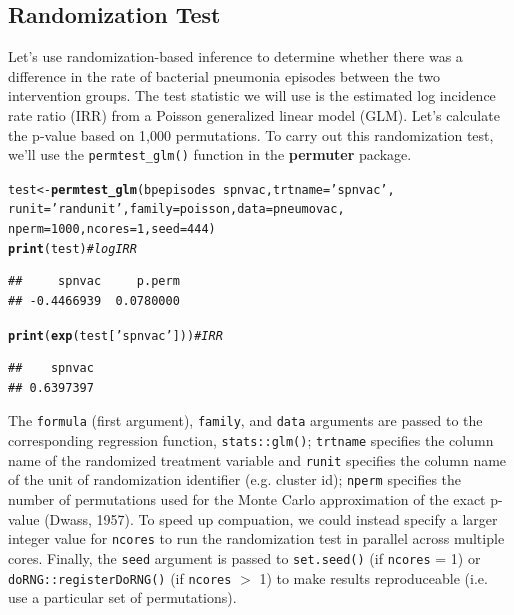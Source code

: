 \documentclass[12pt]{article}\usepackage[]{graphicx}\usepackage[]{color}
\makeatletter
\newcommand{\hlnum}[1]{\textcolor[rgb]{0.686,0.059,0.569}{#1}}%
\newcommand{\hlstr}[1]{\textcolor[rgb]{0.192,0.494,0.8}{#1}}%
\newcommand{\hlcom}[1]{\textcolor[rgb]{0.678,0.584,0.686}{\textit{#1}}}%
\newcommand{\hlopt}[1]{\textcolor[rgb]{0,0,0}{#1}}%
\newcommand{\hlstd}[1]{\textcolor[rgb]{0.345,0.345,0.345}{#1}}%
\newcommand{\hlkwb}[1]{\textcolor[rgb]{0.69,0.353,0.396}{#1}}%
\newcommand{\hlkwc}[1]{\textcolor[rgb]{0.333,0.667,0.333}{#1}}%
\newcommand{\hlkwd}[1]{\textcolor[rgb]{0.737,0.353,0.396}{\textbf{#1}}}%
\newenvironment{kframe}{%
 \def\at@end@of@kframe{}%
 \ifinner\ifhmode%
  \def\at@end@of@kframe{\end{minipage}}%
  \begin{minipage}{\columnwidth}%
 \fi\fi%
 \def\FrameCommand##1{\hskip\@totalleftmargin \hskip-\fboxsep
 \colorbox{shadecolor}{##1}\hskip-\fboxsep
     \hskip-\linewidth \hskip-\@totalleftmargin \hskip\columnwidth}%
 \MakeFramed {\advance\hsize-\width
   \@totalleftmargin\z@ \linewidth\hsize
   \@setminipage}}%
 {\par\unskip\endMakeFramed%
 \at@end@of@kframe}
\newenvironment{knitrout}{}{} %
\makeatother
\begin{document}
\subsection{Randomization Test}
Let's use randomization-based inference to determine whether there was a difference in the rate of bacterial pneumonia episodes between the two intervention groups. The test statistic we will use is the estimated log incidence rate ratio (IRR) from a Poisson generalized linear model (GLM). Let's calculate the p-value based on 1,000 permutations. To carry out this randomization test, we'll use the \texttt{permtest\_glm()} function in the \textbf{permuter} package.
\begin{knitrout}
\color{fgcolor}\begin{kframe}
\begin{alltt}
\hlstd{test} \hlkwb{<-} \hlkwd{permtest_glm}\hlstd{(bpepisodes} \hlopt{~} \hlstd{spnvac,} \hlkwc{trtname} \hlstd{=} \hlstr{'spnvac'}\hlstd{,}
                     \hlkwc{runit} \hlstd{=} \hlstr{'randunit'}\hlstd{,} \hlkwc{family} \hlstd{= poisson,} \hlkwc{data} \hlstd{= pneumovac,}
                     \hlkwc{nperm} \hlstd{=} \hlnum{1000}\hlstd{,} \hlkwc{ncores} \hlstd{=} \hlnum{1}\hlstd{,} \hlkwc{seed} \hlstd{=} \hlnum{444}\hlstd{)}
\hlkwd{print}\hlstd{(test)} \hlcom{# logIRR}
\end{alltt}
\begin{verbatim}
##     spnvac     p.perm 
## -0.4466939  0.0780000
\end{verbatim}
\begin{alltt}
\hlkwd{print}\hlstd{(}\hlkwd{exp}\hlstd{(test[}\hlstr{'spnvac'}\hlstd{]))} \hlcom{# IRR}
\end{alltt}
\begin{verbatim}
##    spnvac 
## 0.6397397
\end{verbatim}
\end{kframe}
\end{knitrout}
The \texttt{formula} (first argument), \texttt{family}, and \texttt{data} arguments are passed to the corresponding regression function, \texttt{stats::glm()}; \texttt{trtname} specifies the column name of the randomized treatment variable and \texttt{runit} specifies the column name of the unit of randomization identifier (e.g. cluster id); \texttt{nperm} specifies the number of permutations used for the Monte Carlo approximation of the exact p-value (Dwass, 1957). To speed up compuation, we could instead specify a larger integer value for \texttt{ncores} to run the randomization test in parallel across multiple cores. Finally, the \texttt{seed} argument is passed to \texttt{set.seed()} (if \texttt{ncores} = 1) or \texttt{doRNG::registerDoRNG()} (if \texttt{ncores} $>$ 1) to make results reproduceable (i.e. use a particular set of permutations).
\end{document}
